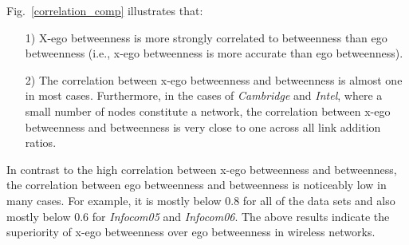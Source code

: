Fig.~\ref{correlation_comp} illustrates that:
\begin{itemize}
  \item[1)] X-ego betweenness is more strongly correlated to betweenness than ego betweenness (i.e., x-ego betweenness is more accurate than ego betweenness).
  \item[2)] The correlation between x-ego betweenness and betweenness is almost one in most cases. 
Furthermore, in the cases of {\em Cambridge} and {\em Intel}, where a small number of nodes constitute a network, the correlation between x-ego betweenness and betweenness is very close to one across all link addition ratios.
\end{itemize} 
In contrast to the high correlation between x-ego betweenness and betweenness, the correlation between ego betweenness and betweenness is noticeably low in many cases.
For example, it is mostly below 0.8 for all of the data sets and also mostly below 0.6 for {\em Infocom05} and {\em Infocom06}.
The above results indicate the superiority of x-ego betweenness over ego betweenness in wireless networks.


